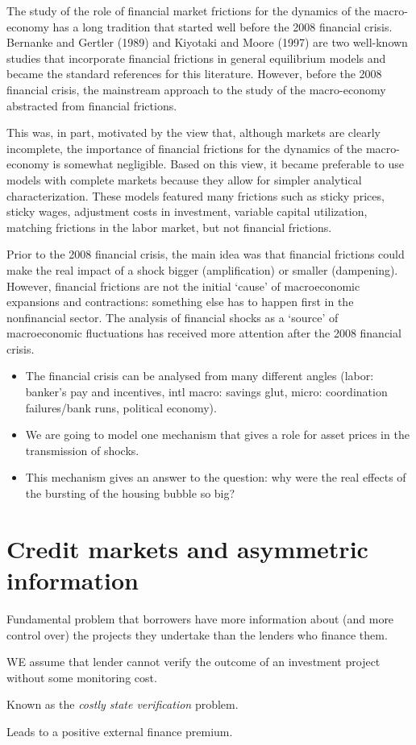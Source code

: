 The study of the role of financial market frictions for the dynamics of the macro-economy
has a long tradition that started well before the 2008 financial crisis. Bernanke and Gertler
(1989) and Kiyotaki and Moore (1997) are two well-known studies that incorporate financial
frictions in general equilibrium models and became the standard references for this literature.
However, before the 2008 financial crisis, the mainstream approach to the study of the
macro-economy abstracted from financial frictions.

This was, in part, motivated by the view that, although markets are clearly incomplete, 
the importance of financial frictions for the dynamics of the macro-economy is somewhat negligible. 
Based on this view, it became preferable to use models with complete markets because they allow 
for simpler analytical characterization. These models featured many frictions such as sticky prices, 
sticky wages, adjustment costs in investment, variable capital utilization, matching frictions in the labor
market, but not financial frictions.

Prior to the 2008 financial crisis, the main idea was that financial frictions could make the real
impact of a shock bigger (amplification) or smaller (dampening). However, financial frictions
are not the initial ‘cause’ of macroeconomic expansions and contractions: something else has
to happen first in the nonfinancial sector. The analysis of financial shocks as a ‘source’ of
macroeconomic fluctuations has received more attention after the 2008 financial crisis.

\begin{itemize}
    \item The financial crisis can be analysed from many different angles
    (labor: banker’s pay and incentives, intl macro: savings glut,
    micro: coordination failures/bank runs, political economy).
    \item We are going to model one mechanism that gives a role for
    asset prices in the transmission of shocks.
    \item This mechanism gives an answer to the question: why were
    the real effects of the bursting of the housing bubble so big?
\end{itemize}

\section{Credit markets and asymmetric information}

Fundamental problem that borrowers have more information
about (and more control over) the projects they undertake
than the lenders who finance them.

WE assume that lender cannot verify the outcome of an investment project
without some monitoring cost.

Known as the \textit{costly state verification} problem.

Leads to a positive external finance premium.


